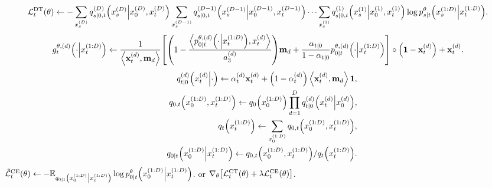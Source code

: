 \documentclass[10pt]{article}
\begin{document}
\begin{algorithm}
\begin{algorithmic}
    \State
    {\color{red}
    \begin{eqnarray*}
      \mathcal{L}^\text{DT}_t(\theta)\gets - \sum_{x_s^{(D)}}q^{(D)}_{s|0,t}\qty(x_s^{(D)}\middle|x_0^{(D)}, x_t^{(D)})\sum_{x_s^{(D-1)}}q^{(D-1)}_{s|0,t}\qty(x_s^{(D-1)}\middle|x_0^{(D-1)}, x_t^{(D-1)})\cdots\sum_{x_s^{(1)}} q^{(1)}_{s|0,t}\qty(x_s^{(1)}\middle|x_0^{(1)}, x_t^{(1)})\log p^\theta_{s|t}\qty(x_s^{(1:D)}\middle|x_t^{(1:D)}).
    \end{eqnarray*}
    }
    \State
    {\color{blue}
    \begin{eqnarray*}
      g^{\theta,(d)}_t\qty(\cdot\middle|x^{(1:D)}_t)\gets \frac{1}{\left\langle \mathbf{x}^{(d)}_t,\mathbf{m}_d\right\rangle}\qty[\qty(1-\frac{\left\langle p^{\theta,(d)}_{0|t}\qty(\cdot\middle|x^{(1:D)}_t),x^{(d)}_t\right\rangle}{a^{(d)}_3})\mathbf{m}_d + \frac{\alpha_{t|0}}{1-\alpha_{t|0}}p^{\theta,(d)}_{0|t}\qty(\cdot\middle|x^{(1:D)}_t)]\circ \qty(\mathbf{1}-\mathbf{x}^{(d)}_t) + \mathbf{x}^{(d)}_t.
    \end{eqnarray*}
    }
    \State
    \begin{eqnarray*}
      &&q^{(d)}_{t|0}\qty(x^{(d)}_t\middle|\cdot) \gets \alpha^{(d)}_t \mathbf{x}^{(d)}_t + \qty(1 - \alpha^{(d)}_t)\left\langle\mathbf{x}^{(d)}_t, \mathbf{m}_d\right\rangle\mathbf{1},\\
      &&q_{0,t}\qty(x^{(1:D)}_0, x^{(1:D)}_t) \gets q_0\qty(x^{(1:D)}_0)\prod_{d=1}^D q^{(d)}_{t|0}\qty(x^{(d)}_t\middle|x^{(d)}_0),\\
      &&q_t\qty(x^{(1:D)}_t) \gets \sum_{x^{(1:D)}_0}q_{0,t}\qty(x^{(1:D)}_0, x^{(1:D)}_t),\\
      &&q_{0|t}\qty(x^{(1:D)}_0\middle|x^{(1:D)}_t) \gets q_{0,t}\qty(x^{(1:D)}_0, x^{(1:D)}_t) / q_t\qty(x^{(1:D)}_t).
    \end{eqnarray*}
    \State $\tilde{\mathcal{L}}^\text{CE}_t(\theta)\gets -\mathbb{E}_{q_{0|t}\qty(x^{(1:D)}_0\middle|x^{(1:D)}_t)}\log p^\theta_{0|t}\qty(x^{(1:D)}_0\middle|x^{(1:D)}_t)$.
     or {\color{blue} $\nabla_\theta\qty[\mathcal{L}^\text{CT}_t(\theta) + \lambda \mathcal{L}^\text{CE}_t(\theta)]$}.
  \end{algorithmic}
\end{algorithm}
\end{document}
